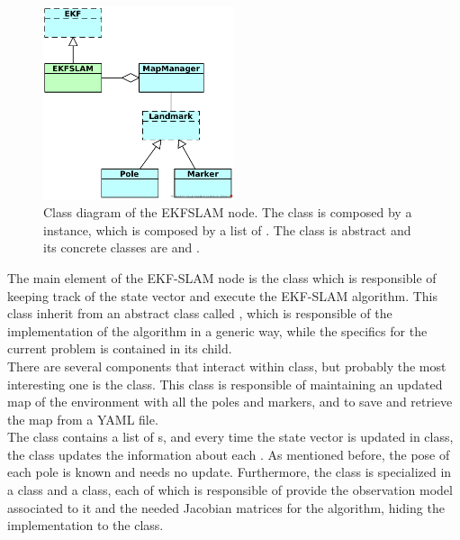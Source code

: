 \begin{figure}[h]
    \centering
    \includegraphics[width=0.5\textwidth]{Figures/fig10-class_diagram}
    \caption[Class diagram of the EKFSLAM node]{Class diagram of the EKFSLAM node. The  class is composed by a  instance, which is composed by a list of . The  class is abstract and its concrete classes are  and .}
    \label{fig:chapter2:architecture:class}
\end{figure}

The main element of the EKF-SLAM node is the  class which is responsible of keeping track of the state vector and execute the EKF-SLAM algorithm. This class inherit from an abstract class called , which is responsible of the implementation of the algorithm in a generic way, while the specifics for the current problem is contained in its child.\\

There are several components that interact within  class, but probably the most interesting one is the  class. This class is responsible of maintaining an updated map of the environment with all the poles and markers, and to save and retrieve the map from a YAML file.\\

The  class contains a list of s, and every time the state vector is updated in  class, the  class updates the information about each . As mentioned before, the pose of each pole is known and needs no update. Furthermore, the  class is specialized in a  class and a  class, each of which is responsible of provide the observation model associated to it and the needed Jacobian matrices for the algorithm, hiding the implementation to the  class.

